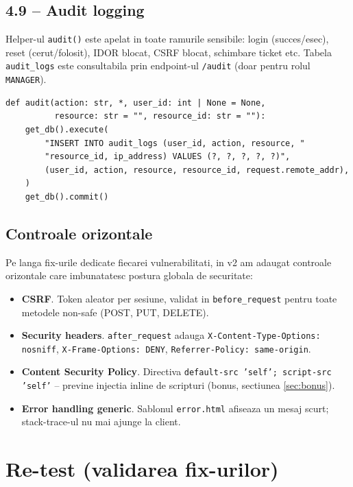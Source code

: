 \documentclass[12pt,a4paper]{article}
\begin{document}
\subsection{4.9 -- Audit logging}
Helper-ul \texttt{audit()} este apelat in toate ramurile sensibile:
login (succes/esec), reset (cerut/folosit), IDOR blocat, CSRF blocat,
schimbare ticket etc. Tabela \texttt{audit\_logs} este consultabila
prin endpoint-ul \texttt{/audit} (doar pentru rolul \texttt{MANAGER}).

\begin{lstlisting}[style=py, caption={Helper de audit}]
def audit(action: str, *, user_id: int | None = None,
          resource: str = "", resource_id: str = ""):
    get_db().execute(
        "INSERT INTO audit_logs (user_id, action, resource, "
        "resource_id, ip_address) VALUES (?, ?, ?, ?, ?)",
        (user_id, action, resource, resource_id, request.remote_addr),
    )
    get_db().commit()
\end{lstlisting}

\subsection{Controale orizontale}
Pe langa fix-urile dedicate fiecarei vulnerabilitati, in v2 am adaugat
controale orizontale care imbunatatesc postura globala de securitate:

\begin{itemize}
  \item \textbf{CSRF}. Token aleator per sesiune, validat in
        \texttt{before\_request} pentru toate metodele non-safe (POST,
        PUT, DELETE).
  \item \textbf{Security headers}. \texttt{after\_request} adauga
        \texttt{X-Content-Type-Options: nosniff},
        \texttt{X-Frame-Options: DENY},
        \texttt{Referrer-Policy: same-origin}.
  \item \textbf{Content Security Policy}. Directiva
        \texttt{default-src 'self'; script-src 'self'} -- previne
        injectia inline de scripturi (bonus, sectiunea \ref{sec:bonus}).
  \item \textbf{Error handling generic}. Sablonul \texttt{error.html}
        afiseaza un mesaj scurt; stack-trace-ul nu mai ajunge la client.
\end{itemize}

\newpage
\section{Re-test (validarea fix-urilor)}\label{sec:retest}
\end{document}

